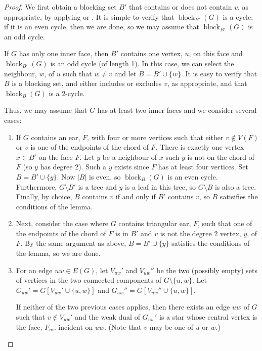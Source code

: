 \documentclass{patmorin}
\DeclareMathOperator{\block}{block}
\begin{document}
\begin{proof}
  We first obtain a blocking set $B'$ that contains or does not
  contain $v$, as appropriate, by applying  or
  . It is simple to verify that $\block_{B'}(G)$
  is a cycle;  if it is an even cycle, then we are done, so we may assume
  that $\block_{B'}(G)$ is an odd cycle.

  If $G$ has only one inner face, then $B'$ contains one vertex,
  $u$, on this face and $\block_{B'}(G)$ is an odd cycle (of length 1).
  In this case, we can select the neighbour, $w$, of $u$ such that
  $w\neq v$ and let $B=B'\cup\{w\}$.  It is easy to verify that $B$ is
  a blocking set, and either includes or excludes $v$, as appropriate,
  and that $\block_B(G)$ is a 2-cycle.

  Thus, we may assume that $G$ has at least two inner faces and we
  consider several cases:
 
  \begin{enumerate}
  \item If $G$ contains an ear, $F$, with four or more vertices such
  that either $v\not\in V(F)$ or $v$ is one of the endpoints of the
  chord of $F$. There is exactly one vertex $x\in B'$ on the face $F$.
  Let $y$ be a neighbour of $x$ such $y$ is not on the chord of $F$
  (so $y$ has degree 2). Such a $y$ exists since $F$ has at least four
  vertices.  Set $B=B'\cup \{y\}$.  Now $|B|$ is even, so $\block_B(G)$
  is an even cycle.  Furthermore, $G\setminus B'$ is a tree and $y$
  is a leaf in this tree, so $G\setminus B$ is also a tree.  Finally,
  by choice, $B$ contains $v$ if and only if $B'$ contains $v$, so $B$
  satisifies the conditions of the lemma.

  \item Next, consider the case where $G$ contains triangular ear, $F$,
  such that one of the endpoints of the chord of $F$ is in $B'$ and $v$
  is not the degree 2 vertex, $y$, of $F$.  By the same argument as above,
  $B=B'\cup\{y\}$ satisfies the conditions of the lemma, so we are done.

  \item 
  For an edge $uw\in E(G)$, let $V_{uw}'$ and $V_{uw}''$ be the two
  (possibly empty) sets of vertices in the two connected components
  of $G\setminus\{u,w\}$.  Let $G_{uw}'=G[V_{uw}'\cup\{u,w\}]$ and
  $G_{uw}''=G[V_{uw}''\cup\{u,w\}]$.

  If neither of the two previous cases applies, then there exists an edge
  $uw$ of $G$ such that $v\not\in V_{uw}'$ and the weak dual of $G_{uw}'$
  is a star whose central vertex is the face, $F_{uw}$ incident on $uw$.
  (Note that $v$ may be one of $u$ or $w$.)


\end{enumerate}
\end{proof}
\end{document}
